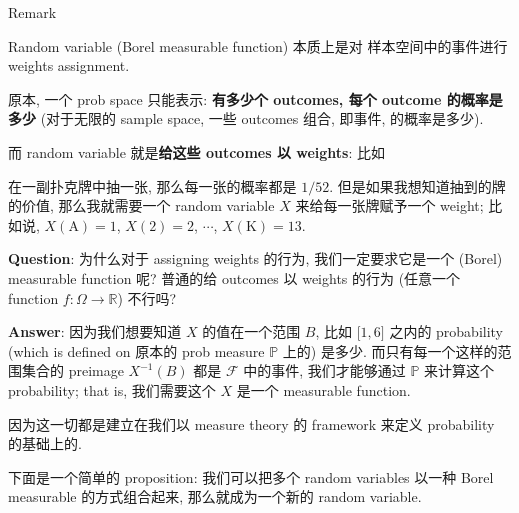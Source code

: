 \documentclass{qlnotes-export}
\begin{document}
\begin{qlremark}{Remark}

Random variable (Borel measurable function) 本质上是对 样本空间中的事件进行 weights assignment.

原本, 一个 prob space 只能表示: \textbf{有多少个 outcomes, 每个 outcome 的概率是多少} (对于无限的 sample space, 一些 outcomes 组合, 即事件, 的概率是多少).

而 random variable 就是\textbf{给这些 outcomes 以 weights}: 比如

\begin{example}\label{ex-02-random-variables-example-001}

在一副扑克牌中抽一张, 那么每一张的概率都是 \(1/52\). 但是如果我想知道抽到的牌的价值, 那么我就需要一个 random variable \(X\) 来给每一张牌赋予一个 weight; 比如说, \(X(\text{A}) = 1\), \(X(2) = 2\), \(\cdots\), \(X(\text{K}) = 13\).\\

\end{example}

\textbf{Question}: 为什么对于 assigning weights 的行为, 我们一定要求它是一个 (Borel) measurable function 呢? 普通的给 outcomes 以 weights 的行为 (任意一个 function \(f:\Omega\rightarrow{\mathbb{R}}\)) 不行吗?

\textbf{Answer}: 因为我们想要知道 \(X\) 的值在一个范围 \(B\), 比如 \(\lbrack 1,6\rbrack\) 之内的 probability (which is defined on 原本的 prob measure \(\mathbb{P}\) 上的) 是多少. 而只有每一个这样的范围集合的 preimage \(X^{- 1}(B)\) 都是 \(\mathcal{F}\) 中的事件, 我们才能够通过 \(\mathbb{P}\) 来计算这个 probability; that is, 我们需要这个 \(X\) 是一个 measurable function.

因为这一切都是建立在我们以 measure theory 的 framework 来定义 probability 的基础上的.\\

\end{qlremark}

下面是一个简单的 proposition: 我们可以把多个 random variables 以一种 Borel measurable 的方式组合起来, 那么就成为一个新的 random variable.
\end{document}
